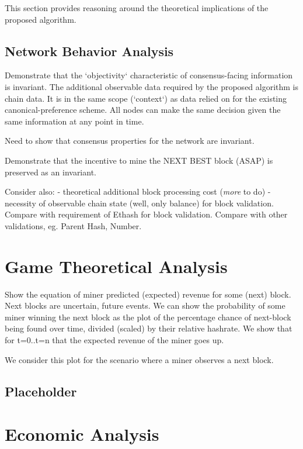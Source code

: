\documentclass[11pt]{article}
\theoremstyle{plain}
\begin{document}
{This section provides reasoning around the theoretical implications of the
proposed algorithm.




\subsection{\normalsize{Network Behavior Analysis}}

Demonstrate that the `objectivity` characteristic of consensus-facing
information is invariant.
The additional observable data required by the proposed algorithm is chain
data. It is in the same scope (`context`) as data relied on for the existing
canonical-preference scheme.
All nodes can make the same decision given the same information at any point in
time.

Need to show that consensus properties for the network are invariant.

Demonstrate that the incentive to mine the NEXT BEST block (ASAP) is preserved
as an invariant.

Consider also:
- theoretical additional block processing cost (\textit{more} to do)
- necessity of observable chain state (well, only balance) for block
validation. Compare with requirement of Ethash for block validation. Compare
with other validations, eg. Parent Hash, Number.

\section{\normalsize{Game Theoretical Analysis}}

Show the equation of miner predicted (expected) revenue for some (next) block.
Next blocks are uncertain, future events.
We can show the probability of some miner winning the next block as the plot of
the percentage chance of next-block being found over time, divided (scaled) by
their relative hashrate.
We show that for t=0..t=n that the expected revenue of the miner goes up.

We consider this plot for the scenario where a miner observes a next block.

\subsection{\small{Placeholder}}

\section{\normalsize{Economic Analysis}}

}
\end{document}
